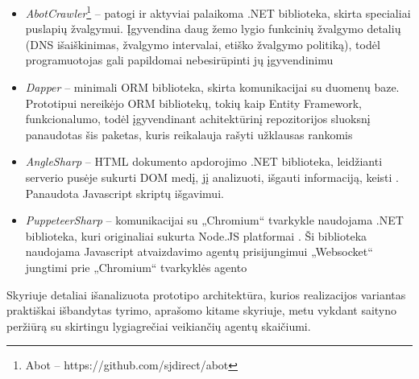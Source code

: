\begin{itemize}
    \item \textit{AbotCrawler}\footnote{Abot -- https://github.com/sjdirect/abot} -- patogi ir aktyviai palaikoma .NET biblioteka, skirta specialiai puslapių žvalgymui. Įgyvendina daug žemo lygio funkcinių žvalgymo detalių (DNS išaiškinimas, žvalgymo intervalai, etiško žvalgymo politiką), todėl programuotojas gali papildomai nebesirūpinti jų įgyvendinimu
    \item \textit{Dapper} -- minimali ORM biblioteka, skirta komunikacijai su duomenų baze. Prototipui nereikėjo ORM bibliotekų, tokių kaip Entity Framework, funkcionalumo, todėl įgyvendinant achitektūrinį repozitorijos sluoksnį panaudotas šis paketas, kuris reikalauja rašyti užklausas rankomis \cite{DapperORM}
     \item \textit{AngleSharp} -- HTML dokumento apdorojimo .NET biblioteka, leidžianti serverio pusėje sukurti DOM medį, jį analizuoti, išgauti informaciją, keisti \cite{AngleSharp}. Panaudota Javascript skriptų išgavimui.
      \item \textit{PuppeteerSharp} -- komunikacijai su „Chromium“ tvarkykle naudojama .NET biblioteka, kuri originaliai sukurta Node.JS platformai \cite{PuppeteerSharp}. Ši biblioteka naudojama Javascript atvaizdavimo agentų prisijungimui „Websocket“ jungtimi prie „Chromium“ tvarkyklės agento
\end{itemize}

Skyriuje detaliai išanalizuota prototipo architektūra, kurios realizacijos variantas praktiškai išbandytas tyrimo, aprašomo kitame skyriuje, metu vykdant saityno peržiūrą su skirtingu lygiagrečiai veikiančių agentų skaičiumi.